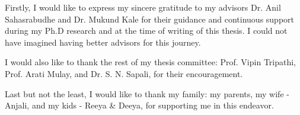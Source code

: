 Firstly, I would like to express my sincere gratitude to my advisors Dr. Anil Sahasrabudhe and Dr. Mukund Kale for their guidance and continuous support during my Ph.D research and at the time of writing of this thesis. I could not have imagined having better advisors for this journey.

I would also like to thank the rest of my thesis committee: Prof. Vipin Tripathi, Prof. Arati Mulay, and Dr. S. N. Sapali, for their encouragement.

Last but not the least, I would like to thank my family: my parents, my wife - Anjali, and my kids - Reeya \& Deeya, for supporting me in this endeavor.
